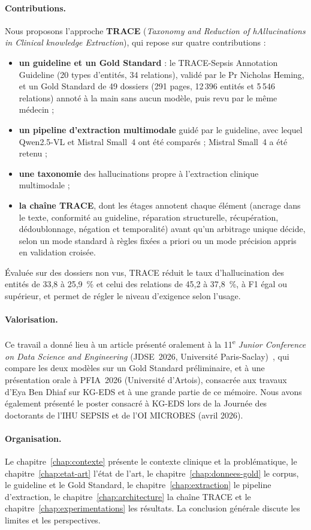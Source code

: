 \paragraph{Contributions.} Nous proposons l’approche \textbf{TRACE} (\textit{Taxonomy and Reduction of hAllucinations in Clinical knowledge Extraction}), qui repose sur quatre contributions :
\begin{itemize}
    \item \textbf{un guideline et un Gold Standard} : le TRACE-Sepsis Annotation Guideline (20 types d’entités, 34 relations), validé par le Pr Nicholas Heming, et un Gold Standard de 49 dossiers (291 pages, 12\,396 entités et 5\,546 relations) annoté à la main sans aucun modèle, puis revu par le même médecin ;
    \item \textbf{un pipeline d’extraction multimodale} guidé par le guideline, avec lequel Qwen2.5-VL et Mistral Small~4 ont été comparés ; Mistral Small~4 a été retenu ;
    \item \textbf{une taxonomie} des hallucinations propre à l’extraction clinique multimodale ;
    \item \textbf{la chaîne TRACE}, dont les étages annotent chaque élément (ancrage dans le texte, conformité au guideline, réparation structurelle, récupération, dédoublonnage, négation et temporalité) avant qu’un arbitrage unique décide, selon un mode standard à règles fixées a priori ou un mode précision appris en validation croisée.
\end{itemize}
Évaluée sur des dossiers non vus, TRACE réduit le taux d’hallucination des entités de 33,8 à 25,9~\% et celui des relations de 45,2 à 37,8~\%, à F1 égal ou supérieur, et permet de régler le niveau d’exigence selon l’usage.

\paragraph{Valorisation.} Ce travail a donné lieu à un article présenté oralement à la 11\textsuperscript{e} \emph{Junior Conference on Data Science and Engineering} (JDSE~2026, Université Paris-Saclay)~\cite{dridi2026jdse}, qui compare les deux modèles sur un Gold Standard préliminaire, et à une présentation orale à PFIA~2026 (Université d’Artois), consacrée aux travaux d’Eya Ben Dhiaf sur KG-EDS et à une grande partie de ce mémoire. Nous avons également présenté le poster consacré à KG-EDS lors de la Journée des doctorants de l’IHU SEPSIS et de l’OI MICROBES (avril 2026).

\paragraph{Organisation.} Le chapitre~\ref{chap:contexte} présente le contexte clinique et la problématique, le chapitre~\ref{chap:etat-art} l’état de l’art, le chapitre~\ref{chap:donnees-gold} le corpus, le guideline et le Gold Standard, le chapitre~\ref{chap:extraction} le pipeline d’extraction, le chapitre~\ref{chap:architecture} la chaîne TRACE et le chapitre~\ref{chap:experimentations} les résultats. La conclusion générale discute les limites et les perspectives.
